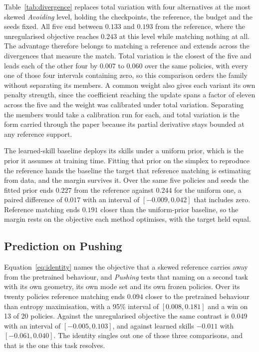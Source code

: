 \documentclass[preprint,12pt]{elsarticle}
\begin{document}
Table~\ref{tab:divergence} replaces total variation with four alternatives at
the most skewed \emph{Avoiding} level, holding the checkpoints, the reference,
the budget and the seeds fixed. All five end between $0.133$ and $0.193$ from
the reference, where the unregularised objective reaches $0.243$ at this level
while matching nothing at all. The advantage therefore belongs to matching a
reference and extends across the divergences that measure the match. Total
variation is the closest of the five and leads each of the other four by
$0.007$ to $0.060$ over the same policies, with every one of those four
intervals containing zero, so this comparison orders the family without
separating its members. A common weight also gives each variant its own penalty
strength, since the coefficient reaching the update spans a factor of eleven
across the five and the weight was calibrated under total variation. Separating
the members would take a calibration run for each, and total variation is the
form carried through the paper because its partial derivative stays bounded at
any reference support.

The learned-skill baseline deploys its skills under a uniform prior, which is
the prior it assumes at training time. Fitting that prior on the simplex to
reproduce the reference hands the baseline the target that reference matching is
estimating from data, and the margin survives it. Over the same five policies and
seeds the fitted prior ends $0.227$ from the reference against $0.244$ for the
uniform one, a paired difference of $0.017$ with an interval of $[-0.009,
0.042]$ that includes zero. Reference matching ends $0.191$ closer than the
uniform-prior baseline, so the margin rests on the objective each method
optimises, with the target held equal.

\subsection{Prediction on Pushing}\label{sec:scope}

Equation~\ref{eq:identity} names the objective that a skewed reference carries
away from the pretrained behaviour, and \emph{Pushing} tests that naming on a
second task with its own geometry, its own mode set and its own frozen
policies. Over its twenty policies reference matching ends $0.094$ closer to
the pretrained behaviour than entropy maximisation, with a 95\% interval of
$[0.008, 0.181]$ and a win on 13 of 20 policies. Against the unregularised
objective the same contrast is $0.049$ with an interval of $[-0.005, 0.103]$,
and against learned skills $-0.011$ with $[-0.061, 0.040]$. The identity
singles out one of those three comparisons, and that is the one this task
resolves.
\end{document}
